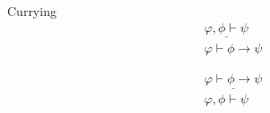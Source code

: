 \begin{ruleinf} \label{relinf_currying} Currying
	\begin{equation}
	\begin{gathered}
		\underline {\varphi, \phi  \vdash \psi } \\
		\varphi \vdash \phi \to \psi 
	\end{gathered}
	\end{equation}

	\begin{equation}
		\begin{gathered}
			\underline {\varphi \vdash \phi \to \psi } \\
			\varphi, \phi  \vdash \psi 
		\end{gathered}
	\end{equation}
\end{ruleinf}
